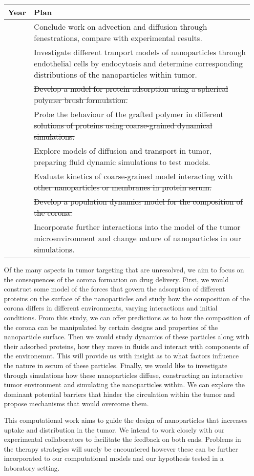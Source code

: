 

\begin{center}
\begin{tabular}{ |p{1.5cm}||p{14cm}|  }
 \hline
 \centering Year & Plan\\
 \hline
 \centering 1   & Conclude work on advection and diffusion through fenestrations, compare with experimental results.\\
                & Investigate different tranport models of nanoparticles through endothelial cells by endocytosis and determine corresponding distributions of the nanoparticles within tumor.\\
                & \st{Develop a model for protein adsorption using a spherical polymer brush formulation.}\\
 \centering 2   & \st{Probe the behaviour of the grafted polymer in different solutions of proteins using coarse-grained dynamical simulations.}\\
                & Explore models of diffusion and transport in tumor, preparing fluid dynamic simulations to test models. \\
 \centering 3   & \st{Evaluate kinetics of coarse-grained model interacting with other nanoparticles or membranes in protein serum.}\\
                & \st{Develop a population dynamics model for the composition of the corona.}\\
                & Incorporate further interactions into the model of the tumor microenvironment and change nature of nanoparticles in our simulations.\\
 \hline
\end{tabular}
\end{center}

Of the many aspects in tumor targeting that are unresolved, we aim to focus on the consequences of the corona formation on drug delivery.
First, we would construct some model of the forces that govern the adsorption of different proteins on the surface of the nanoparticles and study how the composition of the corona differs in different environments, varying interactions and initial conditions.
From this study, we can offer predictions as to how the composition of the corona can be manipulated by certain designs and properties of the nanoparticle surface.
Then we would study dynamics of these particles along with their adsorbed proteins, how they move in fluids and interact with components of the environemnt.
This will provide us with insight as to what factors influence the nature in serum of these particles.
Finally, we would like to investigate through simulations how these nanoparticles diffuse, constructing an interactive tumor environment and simulating the nanoparticles within.
We can explore the dominant potential barriers that hinder the circulation within the tumor and propose mechanisms that would overcome them.

This computational work aims to guide the design of nanoparticles that increases uptake and distribution in the tumor.
We intend to work closely with our experimental collaborators to facilitate the feedback on both ends.
Problems in the therapy strategies will surely be encountered however these can be further incorporated to our computational models and our hypothesis tested in a laboratory setting.
